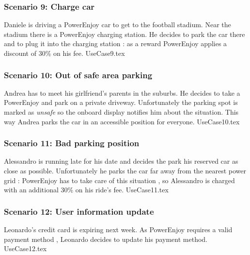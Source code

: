 \documentclass[12pt]{article}
\begin{document}
		\subsubsection{Scenario 9: Charge car}
		Daniele is driving a PowerEnjoy car to get to the football stadium. Near the stadium there is a 
		PowerEnjoy charging station. He decides to park the car there and to plug it into the 
		charging station : as a reward PowerEnjoy applies a discount of 30\% on his fee.
		\FloatBarrier
		{UseCase9.tex}
		\newpage
		
		
		\subsubsection{Scenario 10: Out of safe area parking}
		Andrea has to meet his girlfriend's parents in the suburbs. He decides to take a PowerEnjoy
		and park on a private driveway. Unfortunately the parking spot is marked as \emph{unsafe} so 	
		the onboard  display notifies him about the situation. This way Andrea parks the car in an
		accessible position for everyone.
		\FloatBarrier
		{UseCase10.tex}
		\newpage
		
		\subsubsection{Scenario 11: Bad parking position}
		Alessandro is running late for his date and decides the park his reserved car as close as 
		possible. Unfortunately he parks the car far away from the nearest power grid : PowerEnjoy 
		has to take care of this situation , so Alessandro is charged with an additional 30\% on his
		ride's fee.
		\FloatBarrier
		{UseCase11.tex}
		\newpage
		
		\subsubsection{Scenario 12: User information update}
		Leonardo's credit card is expiring next week. As PowerEnjoy requires a valid payment method ,
		Leonardo decides to update his payment method.
		\FloatBarrier
		{UseCase12.tex}
		\newpage
		
		
		
\end{document}
